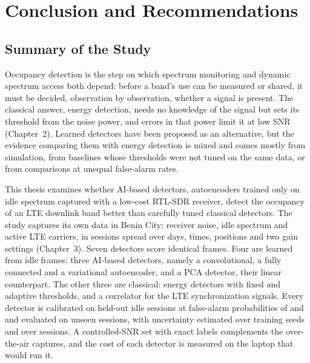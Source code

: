 \chapter{Conclusion and Recommendations}
\label{chap:conclusion}


\section{Summary of the Study}
\label{sec:c-summary}

Occupancy detection is the step on which spectrum monitoring and dynamic spectrum access both depend: before a band's use can be measured or shared, it must be decided, observation by observation, whether a signal is present. The classical answer, energy detection, needs no knowledge of the signal but sets its threshold from the noise power, and errors in that power limit it at low SNR (Chapter~2). Learned detectors have been proposed as an alternative, but the evidence comparing them with energy detection is mixed and comes mostly from simulation, from baselines whose thresholds were not tuned on the same data, or from comparisons at unequal false-alarm rates.

This thesis examines whether AI-based detectors, autoencoders trained only on idle spectrum captured with a low-cost RTL-SDR receiver, detect the occupancy of an LTE downlink band better than carefully tuned classical detectors. The study captures its own data in Benin City: receiver noise, idle spectrum and active LTE carriers, in sessions spread over days, times, positions and two gain settings (Chapter~3). Seven detectors score identical frames. Four are learned from idle frames: three AI-based detectors, namely a convolutional, a fully connected and a variational autoencoder, and a PCA detector, their linear counterpart. The other three are classical: energy detectors with fixed and adaptive thresholds, and a correlator for the LTE synchronization signals. Every detector is calibrated on held-out idle sessions at false-alarm probabilities of  and  and evaluated on unseen sessions, with uncertainty estimated over training seeds and over sessions. A controlled-SNR set with exact labels complements the over-the-air captures, and the cost of each detector is measured on the laptop that would run it.

